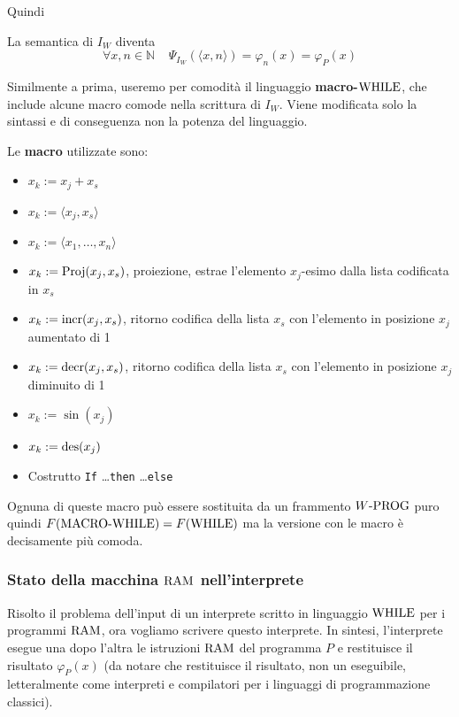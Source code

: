 Quindi
\begin{center}
	
\end{center}

La semantica di $I_W$ diventa
$$ \forall x,n \in \mathbb{N} \;\;\;\; \Psi_{I_W} \left(\langle x,n \rangle \right) = \varphi_n (x) = \varphi_P (x) $$

Similmente a prima, useremo per comodità il linguaggio \textbf{macro-$\text{WHILE}$}, che include alcune macro comode nella scrittura di $I_W$. Viene modificata solo la sintassi e di conseguenza non la potenza del linguaggio.

Le \textbf{macro} utilizzate sono: 
\begin{itemize}
	\item $x_k := x_j + x_s$
	
    \item $x_k := \langle x_j, x_s \rangle$
	
    \item $x_k := \langle x_1, \dots, x_n \rangle$
	
    \item $x_k := \text{Proj}(x_j, x_s)$, proiezione, estrae l'elemento $x_j$-esimo dalla lista codificata in $x_s$
	
    \item $x_k := \text{incr} (x_j, x_s)$, ritorno codifica della lista $x_s$ con l'elemento in posizione $x_j$ aumentato di 1
	
    \item $x_k := \text{decr}(x_j, x_s)$, ritorno codifica della lista $x_s$ con l'elemento in posizione $x_j$ diminuito di 1
	
    \item $x_k := \sin (x_j)$
	
    \item $x_k := \operatorname{des} (x_j)$
	
    \item Costrutto \texttt{If} \dots \texttt{then} \dots \texttt{else}
\end{itemize}

Ognuna di queste macro può essere sostituita da un frammento $W\text{-PROG}$ puro quindi $F(\text{MACRO-}\text{WHILE}) = F(\text{WHILE})$ ma la versione con le macro è decisamente più comoda.

\subsubsection{Stato della macchina $\text{RAM}$ nell'interprete}

Risolto il problema dell'input di un interprete scritto in linguaggio $\text{WHILE}$ per i programmi $\text{RAM}$, ora vogliamo scrivere questo interprete. In sintesi, l'interprete esegue una dopo l'altra le istruzioni $\text{RAM}$ del programma $P$ e restituisce il risultato $\varphi_P (x)$ (da notare che restituisce il risultato, non un eseguibile, letteralmente come interpreti e compilatori per i linguaggi di programmazione classici).


